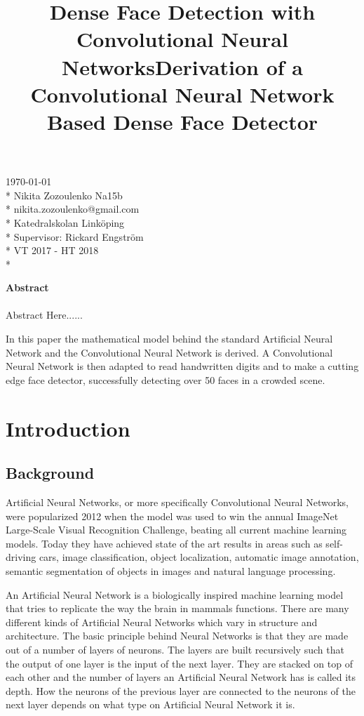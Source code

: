 \documentclass[a4paper,11pt,twoside]{article}
\title{Dense Face Detection with Convolutional Neural Networks}
\title{Derivation of a Convolutional Neural Network Based Dense Face Detector}
\date{}
\begin{document}
\maketitle
\vfill

\begin{flushright}
\today \\*
Nikita Zozoulenko Na15b \\*
nikita.zozoulenko@gmail.com \\*
Katedralskolan Linköping\\*
Supervisor: Rickard Engström \\*
VT 2017 - HT 2018 \\*
\end{flushright}
\newpage

\Large{\textbf{Abstract}}\\\\
Abstract Here......

In this paper the mathematical model behind the standard Artificial Neural Network and the Convolutional Neural Network is derived. A Convolutional Neural Network is then adapted to read handwritten digits and to make a cutting edge face detector, successfully detecting over 50 faces in a crowded scene.
\newpage

\tableofcontents

\section{Introduction}

\subsection{Background}
Artificial Neural Networks, or more specifically Convolutional Neural Networks, were popularized 2012 when the model was used to win the annual ImageNet Large-Scale Visual Recognition Challenge, beating all current machine learning models. Today they have achieved state of the art results in areas such as self-driving cars, image classification, object localization, automatic image annotation, semantic segmentation of objects in images and natural language processing. 
\cite{cs231n}

An Artificial Neural Network is a biologically inspired machine learning model that tries to replicate the way the brain in mammals functions. There are many different kinds of Artificial Neural Networks which vary in structure and architecture. The basic principle behind Neural Networks is that they are made out of a number of layers of neurons. The layers are built recursively such that the output of one layer is the input of the next layer. They are stacked on top of each other and the number of layers an Artificial Neural Network has is called its depth. How the neurons of the previous layer are connected to the neurons of the next layer depends on what type on Artificial Neural Network it is.
\cite{cs231n}
\end{document}
